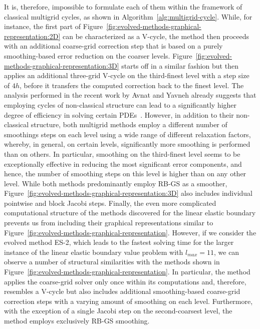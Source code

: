 It is, therefore, impossible to formulate each of them within the framework of classical multigrid cycles, as shown in Algorithm~\ref{alg:multigrid-cycle}.
While, for instance, the first part of Figure~\ref{fig:evolved-methods-graphical-representation:2D} can be characterized as a V-cycle, the method then proceeds with an additional coarse-grid correction step that is based on a purely smoothing-based error reduction on the coarser levels.
Figure~\ref{fig:evolved-methods-graphical-representation:3D} starts off in a similar fashion but then applies an additional three-grid V-cycle on the third-finest level with a step size of $4h$, before it transfers the computed correction back to the finest level.
The analysis performed in the recent work by Avnat and Yavneh already suggests that employing cycles of non-classical structure can lead to a significantly higher degree of efficiency in solving certain PDEs~\cite{avnat2022recursive}. 
However, in addition to their non-classical structure, both multigrid methods employ a different number of smoothings steps on each level using a wide range of different relaxation factors, whereby, in general, on certain levels, significantly more smoothing is performed than on others.
In particular, smoothing on the third-finest level seems to be exceptionally effective in reducing the most significant error components, and hence, the number of smoothing steps on this level is higher than on any other level.
While both methods predominantly employ RB-GS as a smoother, Figure~\ref{fig:evolved-methods-graphical-representation:3D} also includes individual pointwise and block Jacobi steps.
Finally, the even more complicated computational structure of the methods discovered for the linear elastic boundary prevents us from including their graphical representations similar to Figure~\ref{fig:evolved-methods-graphical-representation}.
However, if we consider the evolved method ES-2, which leads to the fastest solving time for the larger instance of the linear elastic boundary value problem with $l_{max} = 11$, we can observe a number of structural similarities with the methods shown in Figure~\ref{fig:evolved-methods-graphical-representation}.
In particular, the method applies the coarse-grid solver only once within its computations and, therefore, resembles a V-cycle but also includes additional smoothing-based coarse-grid correction steps with a varying amount of smoothing on each level.
Furthermore, with the exception of a single Jacobi step on the second-coarsest level, the method employs exclusively RB-GS smoothing.

